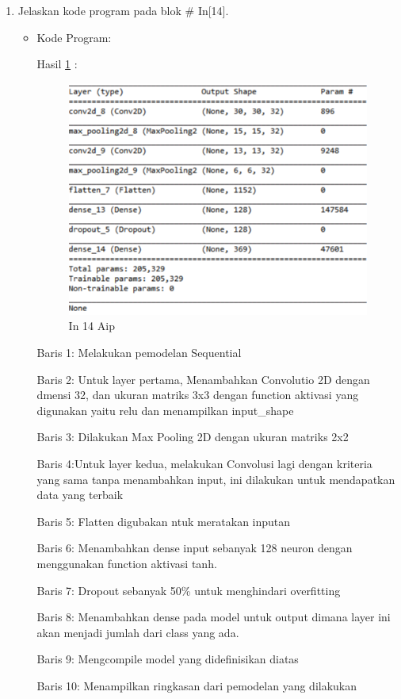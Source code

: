 \begin{enumerate}
\item Jelaskan kode program pada blok \# In[14].
\begin{itemize}
\item Kode Program:

\par Hasil \ref{in14aip} :
\begin{figure}[!hbtp]
\centering
\includegraphics[scale=0.7]{figures/AIP/prak14.PNG}
\caption{In 14 Aip}
\label{in14aip}
\end{figure}
\par Baris 1: Melakukan pemodelan Sequential
\par Baris 2: Untuk layer pertama, Menambahkan Convolutio 2D dengan dmensi 32, dan ukuran matriks 3x3 dengan function aktivasi yang digunakan yaitu relu dan menampilkan input\_shape
\par Baris 3: Dilakukan Max Pooling 2D dengan ukuran matriks 2x2
\par Baris 4:Untuk layer kedua, melakukan Convolusi lagi dengan kriteria yang sama tanpa menambahkan input, ini dilakukan untuk mendapatkan data yang terbaik
\par Baris 5:  Flatten digubakan ntuk meratakan inputan
\par Baris 6: Menambahkan dense input sebanyak 128 neuron dengan menggunakan function aktivasi tanh.
\par Baris 7: Dropout sebanyak 50\% untuk menghindari overfitting
\par Baris 8: Menambahkan dense pada model untuk output dimana layer ini akan menjadi jumlah dari class yang ada.
\par Baris 9: Mengcompile model yang didefinisikan diatas
\par Baris 10: Menampilkan ringkasan dari pemodelan yang dilakukan
\end{itemize}
\par


\end{enumerate}
